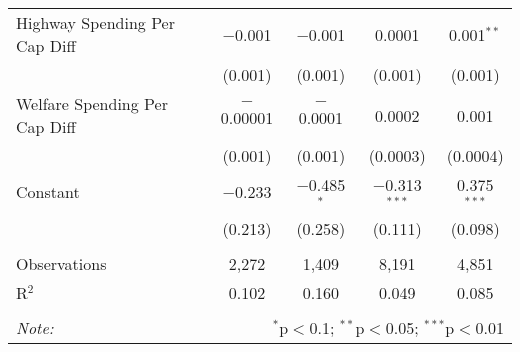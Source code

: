 \begin{table}[!htbp]
\begin{tabular}{@{\extracolsep{5pt}}lcccc}
  Highway Spending Per Cap Diff & $-$0.001 & $-$0.001 & 0.0001 & 0.001$^{**}$ \\ 
  & (0.001) & (0.001) & (0.001) & (0.001) \\ 
  Welfare Spending Per Cap Diff & $-$0.00001 & $-$0.0001 & 0.0002 & 0.001 \\ 
  & (0.001) & (0.001) & (0.0003) & (0.0004) \\ 
  Constant & $-$0.233 & $-$0.485$^{*}$ & $-$0.313$^{***}$ & 0.375$^{***}$ \\ 
  & (0.213) & (0.258) & (0.111) & (0.098) \\ 
 \hline \\[-1.8ex] 
Observations & 2,272 & 1,409 & 8,191 & 4,851 \\ 
R$^{2}$ & 0.102 & 0.160 & 0.049 & 0.085 \\ 
\hline 
\hline \\[-1.8ex] 
\textit{Note:}  & \multicolumn{4}{r}{$^{*}$p$<$0.1; $^{**}$p$<$0.05; $^{***}$p$<$0.01} \\ 
\end{tabular} 
\end{table} 
